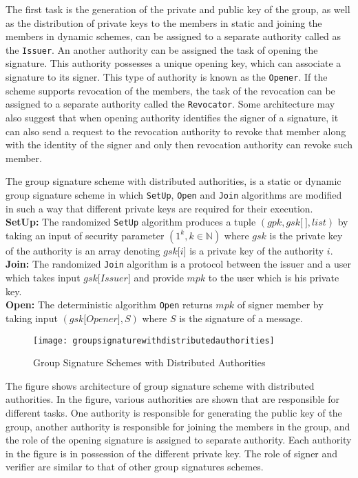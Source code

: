 The first task is the generation of the private and public key of the group, as well as the distribution of private keys to the members in static and joining the members in dynamic schemes, can be assigned to a separate authority called as the \texttt{Issuer}. An another authority can be assigned the task of opening the signature. This authority possesses a unique opening key, which can associate a signature to its signer. This type of authority is known as the \texttt{Opener}. If the scheme supports revocation of the members, the task of the revocation can be assigned to a separate authority called the \texttt{Revocator}. Some architecture may also suggest that when opening authority identifies the signer of a signature, it can also send a request to the revocation authority to revoke that member along with the identity of the signer and only then revocation authority can revoke such member.
\begin{definition}\label{def:Group Signature Scheme with Distributed Authorities}The group signature scheme with distributed authorities, is a static or dynamic group signature scheme in which \texttt{SetUp}, \texttt{Open} and \texttt{Join} algorithms are modified in such a way that different private keys are required for their execution.\\
\textbf{SetUp:} The randomized \texttt{SetUp} algorithm produces a tuple $(gpk, gsk\lbrack~\rbrack, list)$ by taking an input of security parameter $(1^k, k \in \mathbb{N})$ where $gsk$ is the private key of the authority is an array denoting $gsk\lbrack i \rbrack$ is a private key of the authority $i$.\\
\textbf{Join:} The randomized \texttt{Join} algorithm is a protocol between the issuer and a user which takes input $gsk\lbrack Issuer \rbrack$ and provide $mpk$ to the user which is his private key.\\
\textbf{Open:} The deterministic algorithm \texttt{Open} returns $mpk$ of signer member by taking input $(gsk\lbrack Opener \rbrack, S)$ where $S$ is the signature of a message.
\end{definition}
\begin{figure}[h]
    \centering
    \texttt{[image: groupsignaturewithdistributedauthorities]}
    \caption{Group Signature Schemes with Distributed Authorities}
    \label{fig:Group Signature Schemes with Distributed Authorities}
\end{figure}
The figure shows architecture of group signature scheme with distributed authorities. In the figure, various authorities are shown that are responsible for different tasks. One authority is responsible for generating the public key of the group, another authority is responsible for joining the members in the group, and the role of the opening signature is assigned to separate authority. Each authority in the figure is in possession of the different private key. The role of signer and verifier are similar to that of other group signatures schemes.

